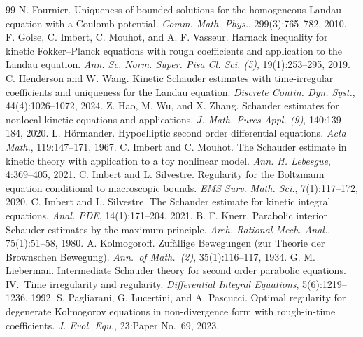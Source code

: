 \documentclass[10pt,a4paper]{amsart}
\numberwithin{equation}{section}
\begin{document}
\begin{thebibliography}{99}
 N. Fournier. \newblock Uniqueness of bounded solutions for the homogeneous Landau equation with a Coulomb potential. \newblock \emph{Comm. Math. Phys.}, 299(3):765--782, 2010.
 F. Golse, C. Imbert, C. Mouhot, and A. F. Vasseur. \newblock Harnack inequality for kinetic Fokker--Planck equations with rough coefficients and application to the Landau equation. \newblock \emph{Ann. Sc. Norm. Super. Pisa Cl. Sci. (5)}, 19(1):253--295, 2019.
 C. Henderson and W. Wang. \newblock Kinetic Schauder estimates with time-irregular coefficients and uniqueness for the Landau equation. \newblock \emph{Discrete Contin. Dyn. Syst.}, 44(4):1026--1072, 2024.
 Z. Hao, M. Wu, and X. Zhang. \newblock Schauder estimates for nonlocal kinetic equations and applications. \newblock \emph{J. Math. Pures Appl. (9)}, 140:139--184, 2020.
 L. H\"ormander. \newblock Hypoelliptic second order differential equations. \newblock \emph{Acta Math.}, 119:147--171, 1967.
 C. Imbert and C. Mouhot. \newblock The Schauder estimate in kinetic theory with application to a toy nonlinear model. \newblock \emph{Ann. H. Lebesgue}, 4:369--405, 2021.
 C. Imbert and L. Silvestre. \newblock Regularity for the Boltzmann equation conditional to macroscopic bounds. \newblock \emph{EMS Surv. Math. Sci.}, 7(1):117--172, 2020.
 C. Imbert and L. Silvestre. \newblock The Schauder estimate for kinetic integral equations. \newblock \emph{Anal. PDE}, 14(1):171--204, 2021.
 B. F. Knerr. \newblock Parabolic interior Schauder estimates by the maximum principle. \newblock \emph{Arch. Rational Mech. Anal.}, 75(1):51--58, 1980.
 A. Kolmogoroff. \newblock Zuf\"allige Bewegungen (zur Theorie der Brownschen Bewegung). \newblock \emph{Ann.\ of Math.\ (2)}, 35(1):116--117, 1934.
 G. M. Lieberman. \newblock Intermediate Schauder theory for second order parabolic equations. IV.\ Time irregularity and regularity. \newblock \emph{Differential Integral Equations}, 5(6):1219--1236, 1992.
 S. Pagliarani, G. Lucertini, and A. Pascucci. \newblock Optimal regularity for degenerate Kolmogorov equations in non-divergence form with rough-in-time coefficients. \newblock \emph{J. Evol. Equ.}, 23:Paper No.~69, 2023.

\end{thebibliography}
\end{document}

